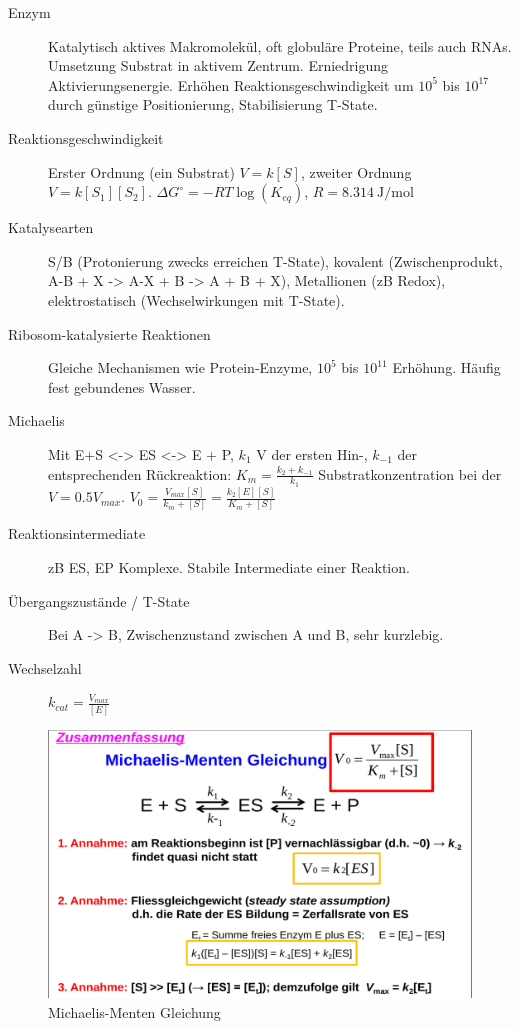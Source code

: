 \documentclass[a4paper,twocolumn,usegeometry,english,fontsize=6,DIV=16]{scrartcl}
\begin{document}
\begin{description}
	\item[Enzym] Katalytisch aktives Makromolekül, oft globuläre Proteine,
		teils auch RNAs. Umsetzung Substrat in aktivem Zentrum.
		Erniedrigung Aktivierungsenergie. Erhöhen
		Reaktionsgeschwindigkeit um $10^5$ bis $10^17$ durch günstige
		Positionierung, Stabilisierung T-State.
	\item[Reaktionsgeschwindigkeit] Erster Ordnung (ein Substrat) $V =
		k[S]$, zweiter Ordnung $V = k [S_1][S_2]$. $\Delta G^\circ = -R
		T \log(K_{eq})$, $R = \SI{8.314}{\J \per \mol}$
	\item[Katalysearten] S/B (Protonierung zwecks erreichen T-State),
		kovalent (Zwischenprodukt, A-B + X -> A-X + B -> A + B + X),
		Metallionen (zB Redox), elektrostatisch (Wechselwirkungen mit
		T-State).
	\item[Ribosom-katalysierte Reaktionen] Gleiche Mechanismen wie
		Protein-Enzyme, $10^5$ bis $10^11$ Erhöhung. Häufig fest
		gebundenes Wasser.
	\item[Michaelis] Mit E+S <-> ES <-> E + P, $k_1$ V der ersten Hin-,
		$k_{-1}$ der entsprechenden Rückreaktion: $K_m = \frac{k_2 +
		k_{-1}}{k_1}$ Substratkonzentration bei der $V = 0.5 V_{max}$.
		$V_0 = \frac{V_{max} [S]}{k_m + [S]} = \frac{k_2[E][S]}{K_m +
		[S]}$
	\item[Reaktionsintermediate] zB ES, EP Komplexe. Stabile Intermediate
		einer Reaktion.
	\item[Übergangszustände / T-State] Bei A -> B, Zwischenzustand zwischen
		A und B, sehr kurzlebig.
	\item[Wechselzahl] $k_{cat} = \frac{V_{max}}{[E]}$
\end{description}

\begin{figure}
	\centering
	\includegraphics[width=0.8\linewidth]{img/michaelis.png}
	\caption{Michaelis-Menten Gleichung}
\end{figure}
\end{document}
